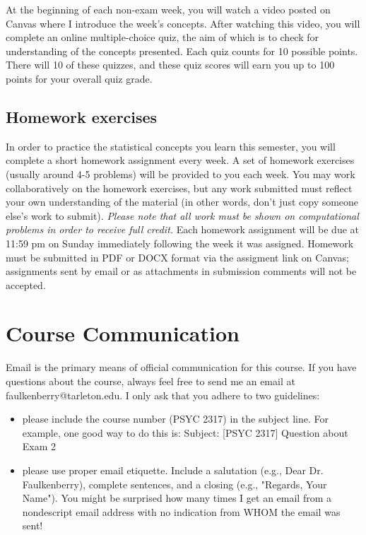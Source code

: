 \documentclass[10pt]{article}
\begin{document}
At the beginning of each non-exam week, you will watch a video posted on Canvas where I introduce the week's concepts. After watching this video, you will complete an online multiple-choice quiz, the aim of which is to check for understanding of the concepts presented. Each quiz counts for 10 possible points. There will 10 of these quizzes, and these quiz scores will earn you up to 100 points for your overall quiz grade.

\subsection*{Homework exercises}
\label{sec:orgab2a7d2}
In order to practice the statistical concepts you learn this semester, you will complete a short homework assignment every week. A set of homework exercises (usually around 4-5 problems) will be provided to you each week. You may work collaboratively on the homework exercises, but any work submitted must reflect your own understanding of the material (in other words, don't just copy someone else's work to submit). \emph{Please note that all work must be shown on computational problems in order to receive full credit.} Each homework assignment will be due at 11:59 pm on Sunday immediately following the week it was assigned. Homework must be submitted in PDF or DOCX format via the assigment link on Canvas; assignments sent by email or as attachments in submission comments will not be accepted.

\section*{Course Communication}
\label{sec:org94b45dc}

Email is the primary means of official communication for this course.  If you have questions about the course, always feel free to send me an email at faulkenberry@tarleton.edu.  I only ask that you adhere to two guidelines:
\begin{itemize}
\item please include the course number (PSYC 2317) in the subject line.  For example, one good way to do this is:  Subject: [PSYC 2317] Question about Exam 2
\item please use proper email etiquette.  Include a salutation (e.g., Dear Dr. Faulkenberry), complete sentences, and a closing (e.g., "Regards, Your Name").  You might be surprised how many times I get an email from a nondescript email address with no indication from WHOM the email was sent!
\end{itemize}
\end{document}
